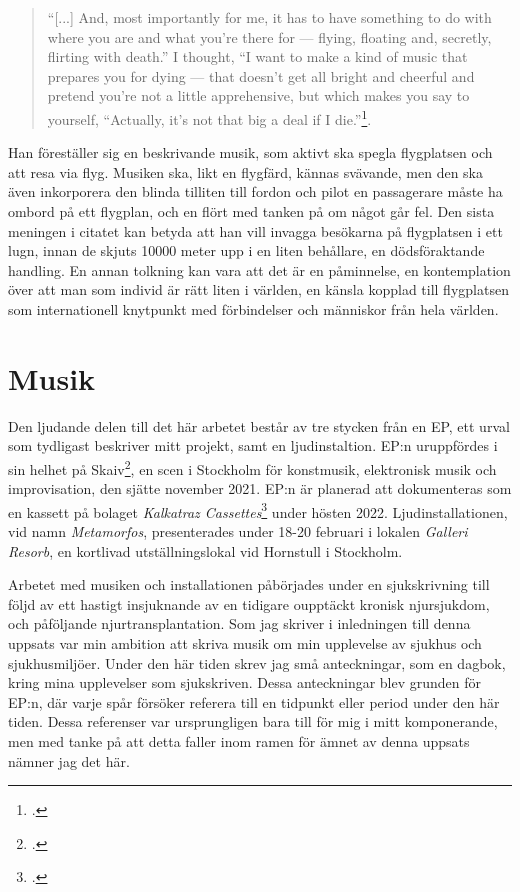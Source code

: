 \documentclass{article}
\begin{document}
\begin{quote}
``[...] And, most importantly for me, it has to have something to do with where you are and what you're there
for --- flying, floating and, secretly, flirting with death.'' I thought, ``I want to make a kind of music
that prepares you for dying --- that doesn't get all bright and cheerful and pretend you're not a little
apprehensive, but which makes you say to yourself, ``Actually, it’s not that big a deal if I
die.''\footcite[152]{Eno}.
\end{quote}
Han föreställer sig en beskrivande musik, som aktivt ska spegla flygplatsen och att resa via flyg. Musiken
ska, likt en flygfärd, kännas svävande, men den ska även inkorporera den blinda tilliten till fordon och pilot
en passagerare måste ha ombord på ett flygplan, och en flört med tanken på om något går fel. Den sista meningen i
citatet kan betyda att han vill invagga besökarna på flygplatsen i ett lugn, innan de skjuts 10000 meter upp 
i en liten behållare, en dödsföraktande handling. En annan tolkning kan vara att det är en påminnelse, en
kontemplation över att man som individ är rätt liten i världen, en känsla kopplad till flygplatsen som 
internationell knytpunkt med förbindelser och människor från hela världen. 

\pagebreak
\section{Musik}
Den ljudande delen till det här arbetet består av tre stycken från en EP, ett urval som tydligast beskriver
mitt projekt, samt en ljudinstaltion. EP:n uruppfördes i sin helhet på Skaiv\footcite{skaiv}, en scen i
Stockholm för konstmusik, elektronisk musik och improvisation, den sjätte november 2021. EP:n är planerad att
dokumenteras som en kassett på bolaget \emph{Kalkatraz Cassettes}\footcite{kalkatraz} under hösten 2022.
Ljudinstallationen, vid namn \emph{Metamorfos}, presenterades under 18-20 februari i lokalen \emph{Galleri
Resorb}, en kortlivad utställningslokal vid Hornstull i Stockholm.

Arbetet med musiken och installationen påbörjades under en sjukskrivning till följd av ett hastigt
insjuknande av en tidigare oupptäckt kronisk njursjukdom, och påföljande njurtransplantation. Som jag skriver
i inledningen till denna uppsats var min ambition att skriva musik om min upplevelse av sjukhus och
sjukhusmiljöer. Under den här tiden skrev jag små anteckningar, som en dagbok, kring mina upplevelser som
sjukskriven. Dessa anteckningar blev grunden för EP:n, där varje spår försöker referera till en tidpunkt eller
period under den här tiden. Dessa referenser var ursprungligen bara till för mig i mitt komponerande, men med
tanke på att detta faller inom ramen för ämnet av denna uppsats nämner jag det här. 
\end{document}
